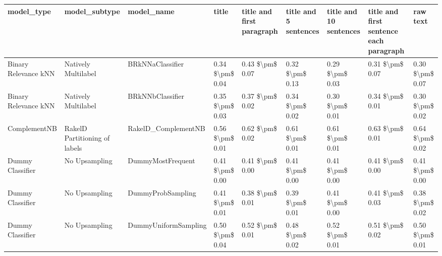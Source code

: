 \begin{tabular}{lllllllll}
\toprule
                     model\_type &                 model\_subtype &                                   model\_name &               title & title and first paragraph & title and 5 sentences & title and 10 sentences & title and first sentence each paragraph &            raw text \\
\midrule
           Binary Relevance kNN &           Natively Multilabel &                             BRkNNaClassifier &     0.34 \$\textbackslash pm\$ 0.04 &           0.43 \$\textbackslash pm\$ 0.07 &       0.32 \$\textbackslash pm\$ 0.13 &        0.29 \$\textbackslash pm\$ 0.03 &                         0.31 \$\textbackslash pm\$ 0.07 &     0.30 \$\textbackslash pm\$ 0.07 \\
           Binary Relevance kNN &           Natively Multilabel &                             BRkNNbClassifier &     0.35 \$\textbackslash pm\$ 0.03 &           0.37 \$\textbackslash pm\$ 0.02 &       0.34 \$\textbackslash pm\$ 0.02 &        0.30 \$\textbackslash pm\$ 0.01 &                         0.34 \$\textbackslash pm\$ 0.01 &     0.30 \$\textbackslash pm\$ 0.02 \\
                   ComplementNB & RakelD Partitioning of labels &                          RakelD\_ComplementNB &     0.56 \$\textbackslash pm\$ 0.01 &           0.62 \$\textbackslash pm\$ 0.02 &       0.61 \$\textbackslash pm\$ 0.01 &        0.61 \$\textbackslash pm\$ 0.01 &                         0.63 \$\textbackslash pm\$ 0.01 &     0.64 \$\textbackslash pm\$ 0.02 \\
               Dummy Classifier &                 No Upsampling &                            DummyMostFrequent &     0.41 \$\textbackslash pm\$ 0.00 &           0.41 \$\textbackslash pm\$ 0.00 &       0.41 \$\textbackslash pm\$ 0.00 &        0.41 \$\textbackslash pm\$ 0.00 &                         0.41 \$\textbackslash pm\$ 0.00 &     0.41 \$\textbackslash pm\$ 0.00 \\
               Dummy Classifier &                 No Upsampling &                            DummyProbSampling &     0.41 \$\textbackslash pm\$ 0.01 &           0.38 \$\textbackslash pm\$ 0.01 &       0.39 \$\textbackslash pm\$ 0.01 &        0.41 \$\textbackslash pm\$ 0.00 &                         0.41 \$\textbackslash pm\$ 0.03 &     0.38 \$\textbackslash pm\$ 0.02 \\
               Dummy Classifier &                 No Upsampling &                         DummyUniformSampling &     0.50 \$\textbackslash pm\$ 0.04 &           0.52 \$\textbackslash pm\$ 0.01 &       0.48 \$\textbackslash pm\$ 0.02 &        0.52 \$\textbackslash pm\$ 0.01 &                         0.51 \$\textbackslash pm\$ 0.02 &     0.50 \$\textbackslash pm\$ 0.01 \\

\end{tabular}
